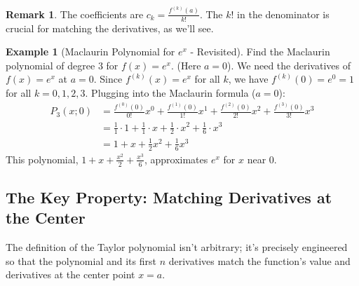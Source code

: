 \documentclass[11pt, a4paper]{article}
\theoremstyle{plain} %
\theoremstyle{definition} %
\newtheorem{example}[theorem]{Example}
\newtheorem{remark}[theorem]{Remark}
\begin{document}
\begin{remark}
The coefficients are $c_k = \frac{f^{(k)}(a)}{k!}$. The $k!$ in the denominator is crucial for matching the derivatives, as we'll see.
\end{remark}

\begin{example}[Maclaurin Polynomial for $e^x$ - Revisited]\label{ex:exp_maclaurin}
Find the Maclaurin polynomial of degree $3$ for $f(x) = e^x$. (Here $a=0$).
We need the derivatives of $f(x)=e^x$ at $a=0$. Since $f^{(k)}(x) = e^x$ for all $k$, we have $f^{(k)}(0) = e^0 = 1$ for all $k=0, 1, 2, 3$.
Plugging into the Maclaurin formula ($a=0$):
\begin{align*}
P_3(x;0) &= \frac{f^{(0)}(0)}{0!}x^0 + \frac{f^{(1)}(0)}{1!}x^1 + \frac{f^{(2)}(0)}{2!}x^2 + \frac{f^{(3)}(0)}{3!}x^3 \\
         &= \frac{1}{1} \cdot 1 + \frac{1}{1} \cdot x + \frac{1}{2} \cdot x^2 + \frac{1}{6} \cdot x^3 \\
         &= 1 + x + \frac{1}{2}x^2 + \frac{1}{6}x^3
\end{align*}
This polynomial, $1 + x + \frac{x^2}{2} + \frac{x^3}{6}$, approximates $e^x$ for $x$ near $0$.
\end{example}

\subsection{The Key Property: Matching Derivatives at the Center}
The definition of the Taylor polynomial isn't arbitrary; it's precisely engineered so that the polynomial and its first $n$ derivatives match the function's value and derivatives at the center point $x=a$.
\end{document}
